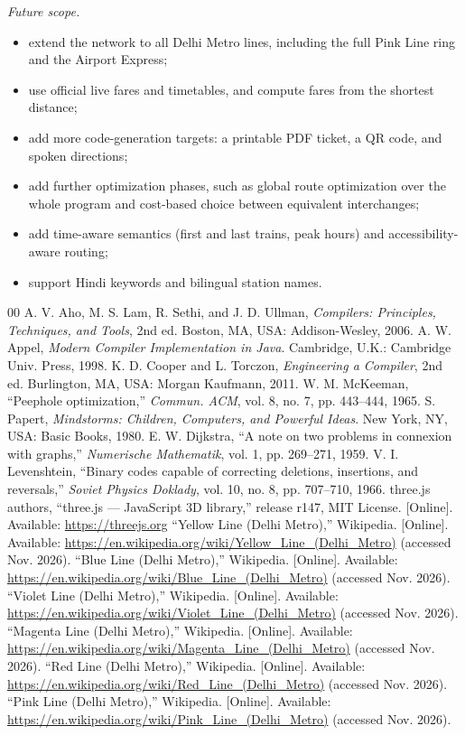\documentclass[conference]{IEEEtran}
\begin{document}
\emph{Future scope.}
\begin{itemize}
\item extend the network to all Delhi Metro lines, including the full Pink Line ring and the Airport Express;
\item use official live fares and timetables, and compute fares from the shortest distance;
\item add more code-generation targets: a printable PDF ticket, a QR code, and spoken directions;
\item add further optimization phases, such as global route optimization over the whole program and cost-based choice between equivalent interchanges;
\item add time-aware semantics (first and last trains, peak hours) and accessibility-aware routing;
\item support Hindi keywords and bilingual station names.
\end{itemize}

\begin{thebibliography}{00}
 A. V. Aho, M. S. Lam, R. Sethi, and J. D. Ullman, \emph{Compilers: Principles, Techniques, and Tools}, 2nd ed. Boston, MA, USA: Addison-Wesley, 2006.
 A. W. Appel, \emph{Modern Compiler Implementation in Java}. Cambridge, U.K.: Cambridge Univ. Press, 1998.
 K. D. Cooper and L. Torczon, \emph{Engineering a Compiler}, 2nd ed. Burlington, MA, USA: Morgan Kaufmann, 2011.
 W. M. McKeeman, ``Peephole optimization,'' \emph{Commun. ACM}, vol. 8, no. 7, pp. 443--444, 1965.
 S. Papert, \emph{Mindstorms: Children, Computers, and Powerful Ideas}. New York, NY, USA: Basic Books, 1980.
 E. W. Dijkstra, ``A note on two problems in connexion with graphs,'' \emph{Numerische Mathematik}, vol. 1, pp. 269--271, 1959.
 V. I. Levenshtein, ``Binary codes capable of correcting deletions, insertions, and reversals,'' \emph{Soviet Physics Doklady}, vol. 10, no. 8, pp. 707--710, 1966.
 three.js authors, ``three.js --- JavaScript 3D library,'' release r147, MIT License. [Online]. Available: \url{https://threejs.org}
 ``Yellow Line (Delhi Metro),'' Wikipedia. [Online]. Available: \url{https://en.wikipedia.org/wiki/Yellow_Line_(Delhi_Metro)} (accessed Nov. 2026).
 ``Blue Line (Delhi Metro),'' Wikipedia. [Online]. Available: \url{https://en.wikipedia.org/wiki/Blue_Line_(Delhi_Metro)} (accessed Nov. 2026).
 ``Violet Line (Delhi Metro),'' Wikipedia. [Online]. Available: \url{https://en.wikipedia.org/wiki/Violet_Line_(Delhi_Metro)} (accessed Nov. 2026).
 ``Magenta Line (Delhi Metro),'' Wikipedia. [Online]. Available: \url{https://en.wikipedia.org/wiki/Magenta_Line_(Delhi_Metro)} (accessed Nov. 2026).
 ``Red Line (Delhi Metro),'' Wikipedia. [Online]. Available: \url{https://en.wikipedia.org/wiki/Red_Line_(Delhi_Metro)} (accessed Nov. 2026).
 ``Pink Line (Delhi Metro),'' Wikipedia. [Online]. Available: \url{https://en.wikipedia.org/wiki/Pink_Line_(Delhi_Metro)} (accessed Nov. 2026).
\end{thebibliography}
\end{document}

